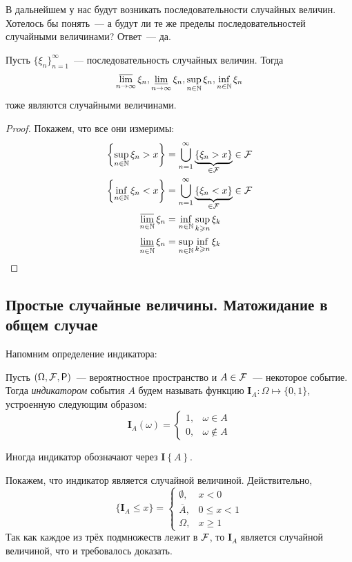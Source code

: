 В дальнейшем у нас будут возникать последовательности случайных величин. Хотелось бы понять~--- а будут ли те же пределы последовательностей случайными величинами? Ответ~--- да.
\begin{theorem}
	Пусть \(\{\xi_n\}_{n = 1}^{\infty}\)~--- последовательность случайных величин. Тогда 
	\[
	\varlimsup\limits_{n \to \infty} \xi_n, \varliminf\limits_{n \to \infty} \xi_n, \sup\limits_{n \in \mathbb{N}} \xi_n, \inf\limits_{n \in \mathbb{N}} \xi_n
	\]
	тоже являются случайными величинами.
\end{theorem}
\begin{proof}
	Покажем, что все они измеримы:
	\begin{align}
		\left\{\sup\limits_{n \in \mathbb{N}} \xi_n > x\right\} &= \bigcup\limits_{n = 1}^{\infty} \underbrace{\left\{\xi_n > x\right\}}_{\in \mathcal{F}} \in \mathcal{F} \\
		\left\{\inf\limits_{n \in \mathbb{N}} \xi_n < x\right\} &= \bigcup\limits_{n = 1}^{\infty} \underbrace{\left\{\xi_n < x\right\}}_{\in \mathcal{F}} \in \mathcal{F} \\
		\varlimsup\limits_{n \in \mathbb{N}} \xi_n &= \inf\limits_{n \in \mathbb{N}} \sup\limits_{k \geqslant n} \xi_k \\
		\varliminf\limits_{n \in \mathbb{N}} \xi_n &= \sup\limits_{n \in \mathbb{N}} \inf\limits_{k \geqslant n} \xi_k\qedhere
	\end{align}
\end{proof}

\subsection{Простые случайные величины. Матожидание в общем случае}

Напомним определение индикатора:
\begin{definition}
	Пусть \((\Omega, \F, \Pr)\)~--- вероятностное пространство и \(A \in \mathcal{F}\)~--- некоторое событие. Тогда \emph{индикатором} события \(A\) будем называть функцию \(\mathbf{I}_{A} : \Omega \mapsto \{0, 1\}\), устроенную следующим образом:
	\[
	\mathbf{I}_{A}(\omega) = \begin{cases}
	1,& \omega \in A \\
	0,& \omega \not\in A
	\end{cases}
	\]
	
	Иногда индикатор обозначают через \(\mathbf{I}\left\{A\right\}\).
\end{definition}

Покажем, что индикатор является случайной величиной. Действительно,
\[
\{\mathbf{I}_{A} \leq x\} = \begin{cases}
\emptyset,& x < 0 \\
\overline{A},& 0 \leq x < 1 \\
\Omega,& x \geq 1
\end{cases}
\]
Так как каждое из трёх подмножеств лежит в \(\mathcal{F}\), то \(\mathbf{I}_{A}\) является случайной величиной, что и требовалось доказать.

